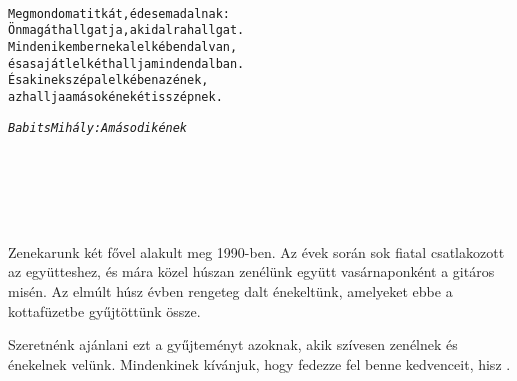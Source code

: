 ~\\[\baselineskip] %
~\\[\baselineskip]
~\\[\baselineskip]
\begin{center}
\begin{minipage}{0.5\textwidth}
{
\begin{alltt}\normalfont\large{}
Megmondom a titkát, édesem a dalnak:
Önmagát hallgatja, aki dalra hallgat.
Mindenik embernek a lelkében dal van,
és a saját lelkét hallja minden dalban.
És akinek szép a lelkében az ének,
az hallja a mások énekét is szépnek.

                \textit{Babits Mihály: A második ének}
\end{alltt}
~\\[\baselineskip] %
~\\[\baselineskip] %
~\\[\baselineskip]
~\\[\baselineskip]
}
\end{minipage}
\end{center}
{\large
Zenekarunk két fővel alakult meg 1990-ben. Az évek során sok fiatal csatlakozott az együtteshez, és mára közel húszan zenélünk együtt vasárnaponként a gitáros misén. Az elmúlt húsz évben rengeteg dalt énekeltünk, amelyeket ebbe a kottafüzetbe gyűjtöttünk össze. 

Szeretnénk ajánlani ezt a gyűjteményt azoknak, akik szívesen zenélnek és énekelnek velünk. Mindenkinek kívánjuk, hogy fedezze fel benne kedvenceit, hisz \cim.

}

\begin{minipage}{\textwidth}
\vspace{0.8cm}
\end{minipage}
\normalsize

\newpage
\mbox{}
\newpage


